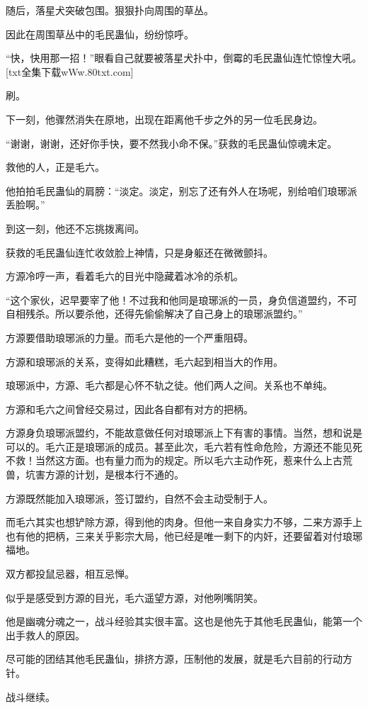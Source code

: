 \begin{this_body}
随后，落星犬突破包围。狠狠扑向周围的草丛。

因此在周围草丛中的毛民蛊仙，纷纷惊呼。

“快，快用那一招！”眼看自己就要被落星犬扑中，倒霉的毛民蛊仙连忙惊惶大吼。[txt全集下载wWw.80txt.com]

刷。

下一刻，他骤然消失在原地，出现在距离他千步之外的另一位毛民身边。

“谢谢，谢谢，还好你手快，要不然我小命不保。”获救的毛民蛊仙惊魂未定。

救他的人，正是毛六。

他拍拍毛民蛊仙的肩膀：“淡定。淡定，别忘了还有外人在场呢，别给咱们琅琊派丢脸啊。”

到这一刻，他还不忘挑拨离间。

获救的毛民蛊仙连忙收敛脸上神情，只是身躯还在微微颤抖。

方源冷哼一声，看着毛六的目光中隐藏着冰冷的杀机。

“这个家伙，迟早要宰了他！不过我和他同是琅琊派的一员，身负信道盟约，不可自相残杀。所以要杀他，还得先偷偷解决了自己身上的琅琊派盟约。”

方源要借助琅琊派的力量。而毛六是他的一个严重阻碍。

方源和琅琊派的关系，变得如此糟糕，毛六起到相当大的作用。

琅琊派中，方源、毛六都是心怀不轨之徒。他们两人之间。关系也不单纯。

方源和毛六之间曾经交易过，因此各自都有对方的把柄。

方源身负琅琊派盟约，不能故意做任何对琅琊派上下有害的事情。当然，想和说是可以的。毛六正是琅琊派的成员。甚至此次，毛六若有性命危险，方源还不能见死不救！当然这方面。也有量力而为的规定。所以毛六主动作死，惹来什么上古荒兽，坑害方源的计划，是根本行不通的。

方源既然能加入琅琊派，签订盟约，自然不会主动受制于人。

而毛六其实也想铲除方源，得到他的肉身。但他一来自身实力不够，二来方源手上也有他的把柄，三来关乎影宗大局，他已经是唯一剩下的内奸，还要留着对付琅琊福地。

双方都投鼠忌器，相互忌惮。

似乎是感受到方源的目光，毛六遥望方源，对他咧嘴阴笑。

他是幽魂分魂之一，战斗经验其实很丰富。这也是他先于其他毛民蛊仙，能第一个出手救人的原因。

尽可能的团结其他毛民蛊仙，排挤方源，压制他的发展，就是毛六目前的行动方针。

战斗继续。


\end{this_body}
